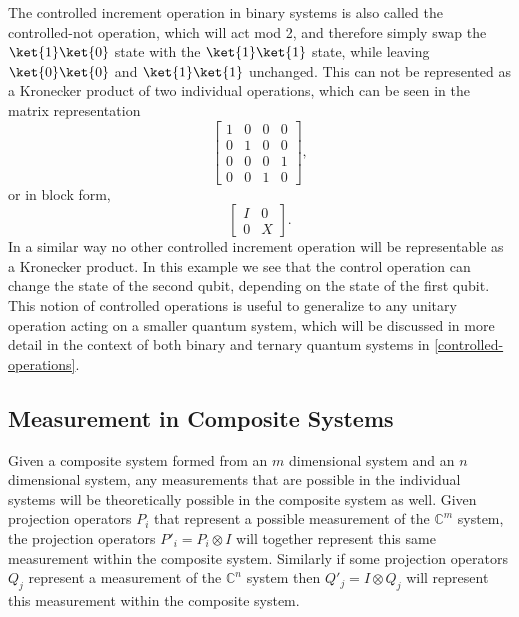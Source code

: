 The controlled increment operation in binary systems is also called the controlled-not operation, which will act mod 2, and therefore simply swap the $\ket{1}\ket{0}$ state with the $\ket{1}\ket{1}$ state, while leaving $\ket{0}\ket{0}$ and $\ket{1}\ket{1}$ unchanged. This can not be represented as a Kronecker product of two individual operations, which can be seen in the matrix representation
\[
\left[\begin{matrix}
1&0&0&0\\
0&1&0&0\\
0&0&0&1\\
0&0&1&0
\end{matrix}\right],
\]
or in block form,
\[\begin{bmatrix}
I & 0 \\
0 & X
\end{bmatrix}.\]
In a similar way no other controlled increment operation will be representable as a Kronecker product. In this example we see that the control operation can change the state of the second qubit, depending on the state of the first qubit. This notion of controlled operations is useful to generalize to any unitary operation acting on a smaller quantum system, which will be discussed in more detail in the context of both binary and ternary quantum systems in \autoref{controlled-operations}.
\subsection{Measurement in Composite Systems}\label{composite-measurement}
Given a composite system formed from an $m$ dimensional system and an $n$ dimensional system, any measurements that are possible in the individual systems will be theoretically possible in the composite system as well. Given projection operators $P_i$ that represent a possible measurement of the $\mathbb{C}^m$ system, the projection operators $P'_i = P_i \otimes I$ will together represent this same measurement within the composite system. Similarly if some projection operators $Q_j$ represent a measurement of the $\mathbb{C}^n$ system then $Q'_j = I\otimes Q_j$ will represent this measurement within the composite system.

